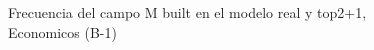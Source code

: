 \begin{figure}[H]
    \centering
    
    \caption{Frecuencia del campo M built en el modelo real y top2+1, Economicos (B-1)}
    \label{frecuency-M Built-top2+1}
\end{figure}